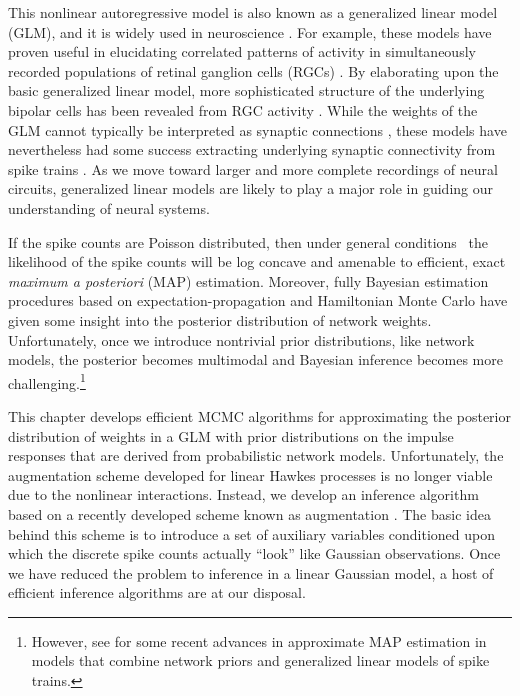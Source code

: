This nonlinear autoregressive model is also known as a generalized
linear model (GLM), and it is widely used in neuroscience
\citep{Paninski-2004, Truccolo-2005}. For example, these models have
proven useful in elucidating correlated patterns of activity in
simultaneously recorded populations of retinal ganglion cells (RGCs)
\citep{Pillow-2008}.  By elaborating upon the basic generalized linear
model, more sophisticated structure of the underlying bipolar cells
has been revealed from RGC activity \citep{freeman2015mapping}.  While the weights of
the GLM cannot typically be interpreted as synaptic connections
\citep{vidne2012modeling}, these models have nevertheless had some
success extracting underlying synaptic connectivity from spike trains
\citep{Gerhard-2013, fletcher2011neural, soudry2015efficient}.  As we
move toward larger and more complete recordings of neural circuits,
generalized linear models are likely to play a major role in guiding our
understanding of neural systems.

If the spike
counts are Poisson distributed, then under general
conditions~\citep{Paninski-2004} the likelihood of the spike counts
will be log concave and amenable to efficient, exact
\emph{maximum a posteriori} (MAP) estimation. 
Moreover, fully Bayesian estimation procedures based on 
expectation-propagation \citep{gerwinn2008bayesian}
and Hamiltonian Monte Carlo \citep{ahmadian2011efficient}
have given some insight into the posterior distribution of 
network weights. 
Unfortunately, once we introduce nontrivial prior
distributions, like network models, the
posterior becomes multimodal and Bayesian inference becomes more
challenging.\footnote{However, see \citet{soudry2015efficient} for 
some recent advances in approximate MAP estimation in models that combine 
network priors and generalized linear models of spike trains.}

This chapter develops efficient MCMC algorithms for approximating the
posterior distribution of weights in a GLM with prior distributions on
the impulse responses that are derived from probabilistic network
models.  Unfortunately, the augmentation scheme developed for linear
Hawkes processes is no longer viable due to the nonlinear
interactions. Instead, we develop an inference algorithm based on a
recently developed scheme known as \polyagamma augmentation
\citep{polson2013bayesian}. The basic idea behind this scheme is to
introduce a set of auxiliary variables conditioned upon which the
discrete spike counts actually ``look'' like Gaussian observations.
Once we have reduced the problem to inference in a linear Gaussian
model, a host of efficient inference algorithms are at our disposal.


